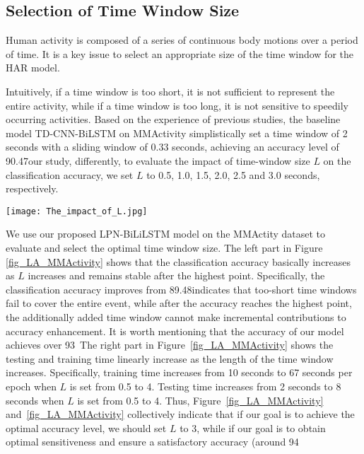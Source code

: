 \subsection{Selection of Time Window Size}

Human activity is composed of a series of continuous body motions over a period of time. 
It is a key issue to select an appropriate size of the time window for the HAR model. 

Intuitively, if a time window is too short, it is not sufficient to represent the entire activity, while if a time window is too long, it is not sensitive to speedily occurring activities. 
Based on the experience of previous studies, the baseline model TD-CNN-BiLSTM on MMActivity simplistically set a time window of 2 seconds with a sliding window of 0.33 seconds, achieving an accuracy level of 90.47\In our study, differently, to evaluate the impact of time-window size $L$ on the classification accuracy, we set $L$ to 0.5, 1.0, 1.5, 2.0, 2.5 and 3.0 seconds, respectively. 


\begin{figure*}[h]
    \centering
    \texttt{[image: The\_impact\_of\_L.jpg]}
    \caption{The impact of the time window $L$ on the accuracy and execution time on the MMActivity dataset}
    \label{fig_LA_MMActivity}
\end{figure*}

We use our proposed LPN-BiLiLSTM model on the MMActity dataset to evaluate and select the optimal time window size.
The left part in Figure \ref{fig_LA_MMActivity} shows that the classification accuracy basically increases as $L$ increases and remains stable after the highest point. Specifically, the classification accuracy improves from 89.48\This indicates that too-short time windows fail to cover the entire event, while after the accuracy reaches the highest point, the additionally added time window cannot make incremental contributions to accuracy enhancement. 
It is worth mentioning that the accuracy of our model achieves over 93\
The right part in Figure~\ref{fig_LA_MMActivity} shows the testing and training time linearly increase as the length of the time window increases. 
Specifically, training time increases from 10 seconds to 67 seconds per epoch when $L$ is set from 0.5 to 4. Testing time increases from 2 seconds to 8 seconds when $L$ is set from 0.5 to 4. 
Thus, Figure~\ref{fig_LA_MMActivity} and~\ref{fig_LA_MMActivity} collectively indicate that if our goal is to achieve the optimal accuracy level, we should set $L$ to 3, while if our goal is to obtain optimal sensitiveness and ensure a satisfactory accuracy (around 94\

